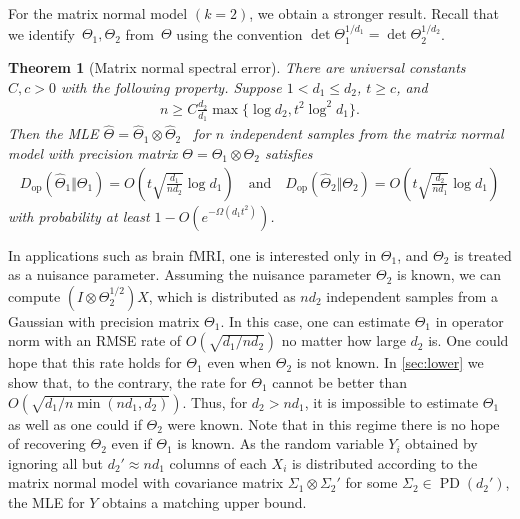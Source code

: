 \documentclass[aos]{imsart}
\newtheorem{theorem}{Theorem}[section]
\theoremstyle{definition}
\numberwithin{equation}{section}
\DeclareMathOperator{\PD}{PD}
\newcommand{\htheta}{\widehat{\Theta}}
\newcommand{\ot}{\otimes}
\newcommand{\Dop}{D_{\operatorname{op}}}
\begin{document}
For the matrix normal model $(k=2)$, we obtain a stronger result.
Recall that we identify~$\Theta_1, \Theta_2$ from~$\Theta$ using the convention $\det\Theta_1^{1/d_1}=\det\Theta_2^{1/d_2}$.

\newcommand{\MatrixSpec}{%
There are universal constants~$C, c>0$ with the following property.
Suppose $1 < d_1\leq d_2$, $t\geq c$, and
\begin{align*}
  n \geq C \frac{d_2}{d_1} \max\{\log d_2, t^2 \log^2 d_1\}.
\end{align*}
Then the MLE $\htheta = \htheta_1 \ot \htheta_2$ \ for $n$ independent samples from the matrix normal model with precision matrix $\Theta = \Theta_1 \ot \Theta_2$ satisfies
\begin{align*}
  \Dop(\widehat{\Theta}_1 \Vert \Theta_1) = O\left(t \sqrt{\frac{d_1}{nd_2}} \log d_1\right)
\quad\text{and}\quad
\Dop(\widehat{\Theta}_2 \Vert \Theta_2) = O\left(t \sqrt{\frac{d_2}{nd_1}} \log d_1 \right)
\end{align*}
with probability at least  $1 - O(e^{ - \Omega( d_1 t^2)})$.}

\begin{theorem}[Matrix normal spectral error]\label{thm:matrix-normal}
\MatrixSpec
\end{theorem}

In applications such as brain fMRI, one is interested only in $\Theta_1$, and $\Theta_2$ is treated as a nuisance parameter.
Assuming the nuisance parameter $\Theta_2$ is known, we can compute $(I \ot \Theta_2^{1/2} )X$, which is distributed as $nd_2$ independent samples from a Gaussian with precision matrix $\Theta_1$.
In this case, one can estimate $\Theta_1$ in operator norm with an RMSE rate of $O(\sqrt{ d_1/ n d_2})$ no matter how large $d_2$ is.
One could hope that this rate holds for $\Theta_1$ even when $\Theta_2$ is not known.
In \cref{sec:lower} we show that, to the contrary, the rate for $\Theta_1$ cannot be better than $O(\sqrt{d_1/ n \min(n d_1, d_2)})$.
Thus, for $d_2 > n d_1$, it is impossible to estimate $\Theta_1$ as well as one could if $\Theta_2$ were known.
Note that in this regime there is no hope of recovering $\Theta_2$ even if $\Theta_1$ is known.
As the random variable $Y_i$ obtained by ignoring all but $d_2' \approx nd_1$ columns of each $X_i$ is distributed according to the matrix normal model with covariance matrix $\Sigma_1 \ot \Sigma_2'$ for some $\Sigma_2 \in \PD(d_2')$, the MLE for $Y$ obtains a matching upper bound.
\end{document}
